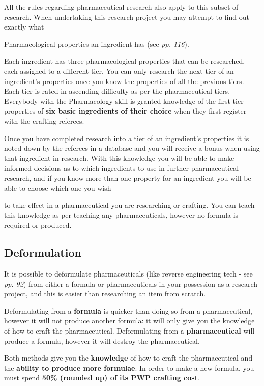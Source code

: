 \documentclass{scrbook}
\begin{document}
All the rules regarding pharmaceutical research also apply to this subset of research. When undertaking this research project you may attempt to find out exactly what

Pharmacological properties an ingredient has (see \textit{pp. 116}).

Each ingredient has three pharmacological properties that can be researched, each assigned to a different tier. You can only research the next tier of an ingredient's properties once you know the properties of all the previous tiers. Each tier is rated in ascending difficulty as per the pharmaceutical tiers. Everybody with the Pharmacology skill is granted knowledge of the first-tier properties of \textbf{six basic ingredients of their choice} when they first register with the crafting referees.

Once you have completed research into a tier of an ingredient's properties it is noted down by the referees in a database and you will receive a bonus when using that ingredient in research. With this knowledge you will be able to make informed decisions as to which ingredients to use in further pharmaceutical research, and if you know more than one property for an ingredient you will be able to choose which one you wish

to take effect in a pharmaceutical you are researching or crafting. You can teach this knowledge as per teaching any pharmaceuticals, however no formula is required or produced.

\subsection{Deformulation}

It is possible to deformulate pharmaceuticals (like reverse engineering tech - see \textit{pp. 92}) from either a formula or pharmaceuticals in your possession as a research project, and this is easier than researching an item from scratch.

Deformulating from a \textbf{formula} is quicker than doing so from a pharmaceutical, however it will not produce another formula: it will only give you the knowledge of how to craft the pharmaceutical. Deformulating from a \textbf{pharmaceutical} will produce a formula, however it will destroy the pharmaceutical.

Both methods give you the \textbf{knowledge} of how to craft the pharmaceutical and the \textbf{ability to produce more formulae}. In order to make a new formula, you must spend \textbf{50\% (rounded up) of its PWP crafting cost}.
\end{document}
